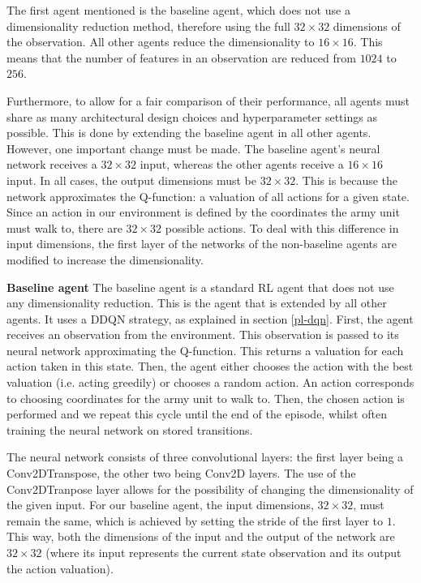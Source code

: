The first agent mentioned is the baseline agent, which does not use a dimensionality reduction method, therefore using the full $32 \times 32$ dimensions of the observation. All other agents reduce the dimensionality to $16 \times 16$. This means that the number of features in an observation are reduced from $1024$ to $256$.

Furthermore, to allow for a fair comparison of their performance, all agents must share as many architectural design choices and hyperparameter settings as possible. This is done by extending the baseline agent in all other agents. However, one important change must be made. The baseline agent's neural network receives a $32 \times 32$ input, whereas the other agents receive a $16 \times 16$ input. In all cases, the output dimensions must be $32 \times 32$. This is because the network approximates the Q-function: a valuation of all actions for a given state. Since an action in our environment is defined by the coordinates the army unit must walk to, there are $32 \times 32$ possible actions. To deal with this difference in input dimensions, the first layer of the networks of the non-baseline agents are modified to increase the dimensionality.\newline

\noindent \textbf{Baseline agent}\newline
\noindent The baseline agent is a standard RL agent that does not use any dimensionality reduction. This is the agent that is extended by all other agents. It uses a DDQN strategy, as explained in section \ref{pl-dqn}. %
First, the agent receives an observation from the environment. This observation is passed to its neural network approximating the Q-function. This returns a valuation for each action taken in this state. Then, the agent either chooses the action with the best valuation (i.e. acting greedily) or chooses a random action. An action corresponds to choosing coordinates for the army unit to walk to. Then, the chosen action is performed and we repeat this cycle until the end of the episode, whilst often training the neural network on stored transitions.

The neural network consists of three convolutional layers: the first layer being a Conv2DTranspose, the other two being Conv2D layers. The use of the Conv2DTranpose layer allows for the possibility of changing the dimensionality of the given input. For our baseline agent, the input dimensions, $32 \times 32$, must remain the same, which is achieved by setting the stride of the first layer to $1$. This way, both the dimensions of the input and the output of the network are $32 \times 32$ (where its input represents the current state observation and its output the action valuation).\newline

